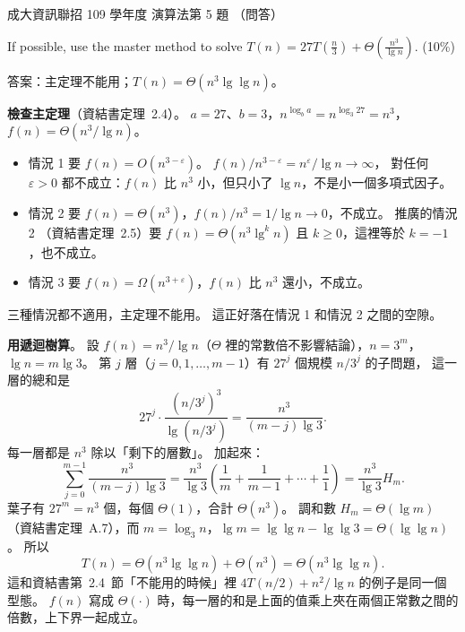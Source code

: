 \begin{pastexam}[label={px:ncku-109-prog-08}]{成大資訊聯招 109 學年度 演算法第 5 題}
（問答）

If possible, use the master method to solve $T(n)=27T(\frac{n}{3})+\Theta(\frac{n^3}{\lg n})$.
(10\%)
\end{pastexam}

\begin{pastsoln}
答案：主定理不能用；$T(n) = \Theta(n^3 \lg\lg n)$。

\textbf{檢查主定理}（資結書定理~2.4）。 $a = 27$、$b = 3$，$n^{\log_b a} = n^{\log_3 27} = n^3$，
$f(n) = \Theta(n^3/\lg n)$。
\begin{itemize}
\item 情況 1 要 $f(n) = O(n^{3 - \varepsilon})$。 $f(n)/n^{3-\varepsilon} = n^{\varepsilon}/\lg n \to \infty$，
對任何 $\varepsilon > 0$ 都不成立：$f(n)$ 比 $n^3$ 小，但只小了 $\lg n$，不是小一個多項式因子。
\item 情況 2 要 $f(n) = \Theta(n^3)$，$f(n)/n^3 = 1/\lg n \to 0$，不成立。 推廣的情況 2
（資結書定理~2.5）要 $f(n) = \Theta(n^3 \lg^k n)$ 且 $k \ge 0$，這裡等於 $k = -1$，也不成立。
\item 情況 3 要 $f(n) = \Omega(n^{3+\varepsilon})$，$f(n)$ 比 $n^3$ 還小，不成立。
\end{itemize}
三種情況都不適用，主定理不能用。 這正好落在情況 1 和情況 2 之間的空隙。

\textbf{用遞迴樹算}。 設 $f(n) = n^3/\lg n$（$\Theta$ 裡的常數倍不影響結論），$n = 3^m$，
$\lg n = m \lg 3$。 第 $j$ 層（$j = 0, 1, \ldots, m - 1$）有 $27^j$ 個規模 $n/3^j$ 的子問題，
這一層的總和是
\[
27^j \cdot \frac{(n/3^j)^3}{\lg (n/3^j)} = \frac{n^3}{(m - j)\lg 3}.
\]
每一層都是 $n^3$ 除以「剩下的層數」。 加起來：
\[
\sum_{j=0}^{m-1} \frac{n^3}{(m - j)\lg 3} = \frac{n^3}{\lg 3}\left(\frac1m + \frac1{m-1} + \cdots + \frac11\right)
= \frac{n^3}{\lg 3} H_m .
\]
葉子有 $27^m = n^3$ 個，每個 $\Theta(1)$，合計 $\Theta(n^3)$。 調和數 $H_m = \Theta(\lg m)$
（資結書定理~A.7），而 $m = \log_3 n$，$\lg m = \lg\lg n - \lg\lg 3 = \Theta(\lg\lg n)$。 所以
\[
T(n) = \Theta(n^3 \lg\lg n) + \Theta(n^3) = \Theta(n^3 \lg\lg n).
\]
這和資結書第~2.4~節「不能用的時候」裡 $4T(n/2) + n^2/\lg n$ 的例子是同一個型態。 $f(n)$ 寫成
$\Theta(\cdot)$ 時，每一層的和是上面的值乘上夾在兩個正常數之間的倍數，上下界一起成立。
\end{pastsoln}
